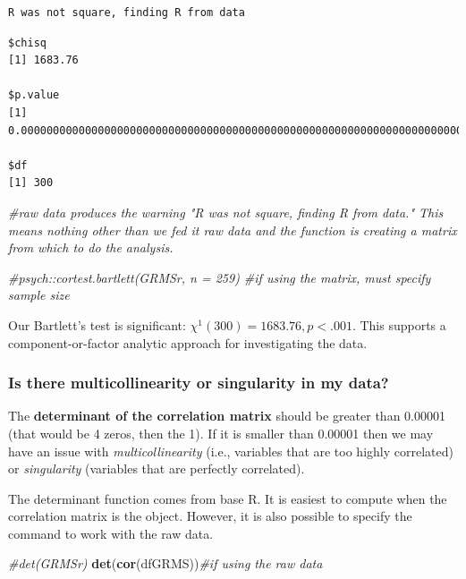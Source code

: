 \documentclass[
  english,
]{book}
\newenvironment{Shaded}{\begin{snugshade}}{\end{snugshade}}
\newcommand{\CommentTok}[1]{\textcolor[rgb]{0.56,0.35,0.01}{\textit{#1}}}
\newcommand{\KeywordTok}[1]{\textcolor[rgb]{0.13,0.29,0.53}{\textbf{#1}}}
\newcommand{\NormalTok}[1]{#1}
\begin{document}
\begin{verbatim}
R was not square, finding R from data
\end{verbatim}

\begin{verbatim}
$chisq
[1] 1683.76

$p.value
[1] 0.00000000000000000000000000000000000000000000000000000000000000000000000000000000000000000000000000000000000000000000000000000000000000000000000000000000000000000000000000000000000000000000005520916

$df
[1] 300
\end{verbatim}

\begin{Shaded}
\begin{Highlighting}[]
\CommentTok{#raw data produces the warning "R was not square, finding R from data." This means nothing other than we fed it raw data and the function is creating a matrix from which to do the analysis.}

\CommentTok{#psych::cortest.bartlett(GRMSr, n = 259) #if using the matrix, must specify sample size}
\end{Highlighting}
\end{Shaded}

Our Bartlett's test is significant: \(\chi ^{1}(300)=1683.76, p < .001\). This supports a component-or-factor analytic approach for investigating the data.

\hypertarget{is-there-multicollinearity-or-singularity-in-my-data-1}{%
\subsubsection{Is there multicollinearity or singularity in my data?}\label{is-there-multicollinearity-or-singularity-in-my-data-1}}

The \textbf{determinant of the correlation matrix} should be greater than 0.00001 (that would be 4 zeros, then the 1). If it is smaller than 0.00001 then we may have an issue with \emph{multicollinearity} (i.e., variables that are too highly correlated) or \emph{singularity} (variables that are perfectly correlated).

The determinant function comes from base R. It is easiest to compute when the correlation matrix is the object. However, it is also possible to specify the command to work with the raw data.

\begin{Shaded}
\begin{Highlighting}[]
\CommentTok{#det(GRMSr) }
\KeywordTok{det}\NormalTok{(}\KeywordTok{cor}\NormalTok{(dfGRMS))}\CommentTok{#if using the raw data}
\end{Highlighting}
\end{Shaded}
\end{document}
